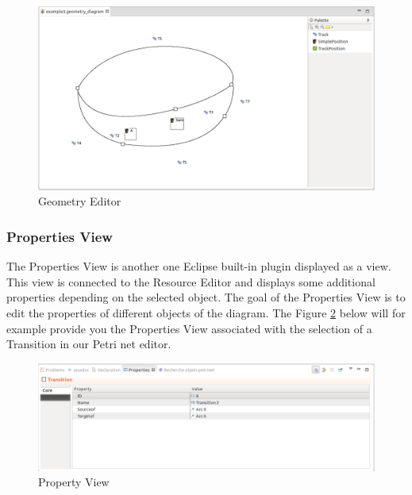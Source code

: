 \begin{figure}[htp]
\begin{center}
  \includegraphics[scale=0.45]{image/gui_geometry_editor.png}
  \caption{Geometry Editor}
  \label{fig:gui_geometry_editor}
\end{center}
\end{figure}

\subsubsection{Properties View}
The Properties View is another one Eclipse built-in plugin displayed as a view. This view is connected to the Resource Editor and displays some additional properties depending on the selected object. The goal of the Properties View is to edit the properties of different objects of the diagram. The Figure \ref{fig:gui_property_editor} below will for example provide you the Properties View associated with the selection of a Transition in our Petri net editor.

\begin{figure}[htp]
\begin{center}
  \includegraphics[scale=0.30]{image/gui_property_editor.png}
  \caption{Property View}
  \label{fig:gui_property_editor}
\end{center}
\end{figure}

